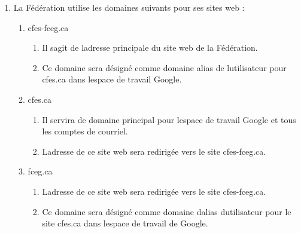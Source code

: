 \begin{enumerate}
 \item
  La Fédération utilise les domaines suivants pour ses sites web :

  \begin{enumerate}
   \item
    cfes-fceg.ca

    \begin{enumerate}
     \item
      Il s\textquotesingle agit de l\textquotesingle adresse principale du site web de la Fédération.
     \item
      Ce domaine sera désigné comme domaine alias de l\textquotesingle utilisateur pour cfes.ca dans l\textquotesingle espace de travail Google.
    \end{enumerate}
   \item
    cfes.ca

    \begin{enumerate}
     \item
      Il servira de domaine principal pour l\textquotesingle espace de travail Google et tous les comptes de courriel.
     \item
      L\textquotesingle adresse de ce site web sera redirigée vers le site cfes-fceg.ca.
    \end{enumerate}
   \item
    fceg.ca

    \begin{enumerate}
     \item
      L\textquotesingle adresse de ce site web sera redirigée vers le site cfes-fceg.ca.
     \item
      Ce domaine sera désigné comme domaine d\textquotesingle alias d\textquotesingle utilisateur pour le site cfes.ca dans l\textquotesingle espace de travail de Google.
    \end{enumerate}
  \end{enumerate}
\end{enumerate}

